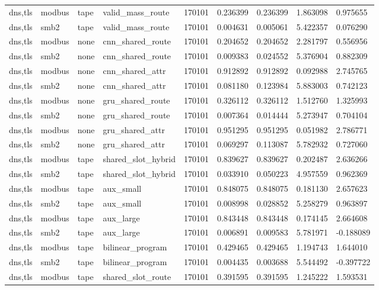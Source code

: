 \begin{tabular}{lllllllll}
dns,tls & modbus & tape & valid\_mass\_route & 170101 & 0.236399 & 0.236399 & 1.863098 & 0.975655 \\
dns,tls & smb2 & tape & valid\_mass\_route & 170101 & 0.004631 & 0.005061 & 5.422357 & 0.076290 \\
dns,tls & modbus & none & cnn\_shared\_route & 170101 & 0.204652 & 0.204652 & 2.281797 & 0.556956 \\
dns,tls & smb2 & none & cnn\_shared\_route & 170101 & 0.009383 & 0.024552 & 5.376904 & 0.882309 \\
dns,tls & modbus & none & cnn\_shared\_attr & 170101 & 0.912892 & 0.912892 & 0.092988 & 2.745765 \\
dns,tls & smb2 & none & cnn\_shared\_attr & 170101 & 0.081180 & 0.123984 & 5.883003 & 0.742123 \\
dns,tls & modbus & none & gru\_shared\_route & 170101 & 0.326112 & 0.326112 & 1.512760 & 1.325993 \\
dns,tls & smb2 & none & gru\_shared\_route & 170101 & 0.007364 & 0.014444 & 5.273947 & 0.704104 \\
dns,tls & modbus & none & gru\_shared\_attr & 170101 & 0.951295 & 0.951295 & 0.051982 & 2.786771 \\
dns,tls & smb2 & none & gru\_shared\_attr & 170101 & 0.069297 & 0.113087 & 5.782932 & 0.727060 \\
dns,tls & modbus & tape & shared\_slot\_hybrid & 170101 & 0.839627 & 0.839627 & 0.202487 & 2.636266 \\
dns,tls & smb2 & tape & shared\_slot\_hybrid & 170101 & 0.033910 & 0.050223 & 4.957559 & 0.962369 \\
dns,tls & modbus & tape & aux\_small & 170101 & 0.848075 & 0.848075 & 0.181130 & 2.657623 \\
dns,tls & smb2 & tape & aux\_small & 170101 & 0.008998 & 0.028852 & 5.258279 & 0.963897 \\
dns,tls & modbus & tape & aux\_large & 170101 & 0.843448 & 0.843448 & 0.174145 & 2.664608 \\
dns,tls & smb2 & tape & aux\_large & 170101 & 0.006891 & 0.009583 & 5.781971 & -0.188089 \\
dns,tls & modbus & tape & bilinear\_program & 170101 & 0.429465 & 0.429465 & 1.194743 & 1.644010 \\
dns,tls & smb2 & tape & bilinear\_program & 170101 & 0.004435 & 0.003688 & 5.544492 & -0.397722 \\
dns,tls & modbus & tape & shared\_slot\_route & 170101 & 0.391595 & 0.391595 & 1.245222 & 1.593531 \\

\end{tabular}
